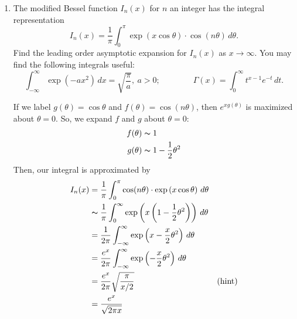 \documentclass[10pt,letterpaper]{report}
\begin{document}
\begin{enumerate}
\item \begin{qbox}
The modified Bessel function $I_n(x)$ for $n$ an integer has the integral representation
\[
I_n(x) = \frac{1}{\pi} \int_0^\pi \exp\left( x\cos\theta \right)\cdot \cos(n\theta)\,d\theta.
\]
Find the leading order asymptotic expansion for $I_n(x)$ as $x \to\infty$. You may find the following integrals useful:
\[
\int_{-\infty}^\infty \exp\left( -ax^2 \right)\,dx = \sqrt{\frac{\pi}{a}},\ a > 0; 
\qquad \qquad 
\Gamma(x) = \int_0^\infty t^{x-1}e^{-t}\,dt.
\]
\end{qbox}

If we label $g(\theta) = \cos\theta$ and $f(\theta) = \cos(n\theta)$, then $e^{xg(\theta)}$ is maximized about $\theta = 0$. So, we expand $f$ and $g$ about $\theta = 0:$
\begin{align*}
    f(\theta) &\thicksim 1 \\
    g(\theta) &\thicksim 1 - \frac{1}{2}\theta^2
\end{align*}
Then, our integral is approximated by
\begin{align*}
    I_n(x) &= \frac{1}{\pi} \int_0^\pi \cos(n\theta)\cdot \exp\left( x\cos\theta \right)\,d\theta
    \\
    &\thicksim \frac{1}{\pi}\int_0^\infty \exp\left(x\left(1 - \frac{1}{2}\theta^2\right)\right)\,d\theta
    \\
    &= \frac{1}{2\pi}\int_{-\infty}^\infty \exp\left(x - \frac{x}{2}\theta^2\right)\,d\theta
    \\
    &= \frac{e^x}{2\pi}\int_{-\infty}^\infty \exp\left(- \frac{x}{2}\theta^2\right)\,d\theta
    \\
    &= \frac{e^x}{2\pi}\sqrt{\frac{\pi}{x/2}} &\textrm{(hint)}
    \\
    &=
    \frac{e^x}{\sqrt{2\pi x}}
\end{align*}


\end{enumerate}
\end{document}
